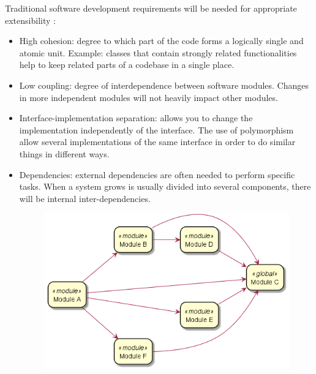 \documentclass[11pt,english]{article} %
\begin{document}
Traditional software development requirements will be needed for appropriate extensibility \cite{philosophy-extensible-software}:
\begin{itemize}
    \item High cohesion: degree to which part of the code forms a logically single and atomic unit. Example: classes that contain strongly related functionalities help to keep related parts of a codebase in a single place. %
    \item Low coupling: degree of interdependence between software modules. %
    Changes in more independent modules will not heavily impact other modules. %
    \item Interface-implementation separation: allows you to change the implementation independently of the interface. 
    The use of polymorphism allow several implementations of the same interface in order to do similar things in different ways. %
    \item Dependencies: external dependencies are often needed to perform specific tasks. When a system grows is usually divided into several components, there will be internal inter-dependencies.
    \begin{figure}[H]
        \centering
        \includegraphics[scale=0.45]{img/dependency-graph.png}
        \label{fig:dependency-graph}

\end{figure}
\end{itemize}
\end{document}
